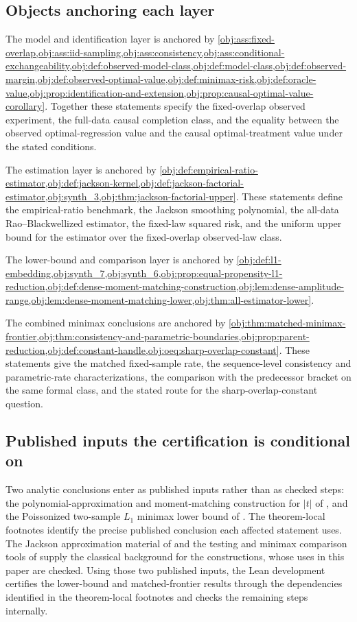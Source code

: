 \subsection*{Objects anchoring each layer}

The model and identification layer is anchored by \cref{obj:ass:fixed-overlap,obj:ass:iid-sampling,obj:ass:consistency,obj:ass:conditional-exchangeability,obj:def:observed-model-class,obj:def:model-class,obj:def:observed-margin,obj:def:observed-optimal-value,obj:def:minimax-risk,obj:def:oracle-value,obj:prop:identification-and-extension,obj:prop:causal-optimal-value-corollary}. Together these statements specify the fixed-overlap observed experiment, the full-data causal completion class, and the equality between the observed optimal-regression value and the causal optimal-treatment value under the stated conditions.

The estimation layer is anchored by \cref{obj:def:empirical-ratio-estimator,obj:def:jackson-kernel,obj:def:jackson-factorial-estimator,obj:synth_3,obj:thm:jackson-factorial-upper}. These statements define the empirical-ratio benchmark, the Jackson smoothing polynomial, the all-data Rao--Blackwellized estimator, the fixed-law squared risk, and the uniform upper bound for the estimator over the fixed-overlap observed-law class.

The lower-bound and comparison layer is anchored by \cref{obj:def:l1-embedding,obj:synth_7,obj:synth_6,obj:prop:equal-propensity-l1-reduction,obj:def:dense-moment-matching-construction,obj:lem:dense-amplitude-range,obj:lem:dense-moment-matching-lower,obj:thm:all-estimator-lower}.

The combined minimax conclusions are anchored by \cref{obj:thm:matched-minimax-frontier,obj:thm:consistency-and-parametric-boundaries,obj:prop:parent-reduction,obj:def:constant-handle,obj:oeq:sharp-overlap-constant}. These statements give the matched fixed-sample rate, the sequence-level consistency and parametric-rate characterizations, the comparison with the predecessor bracket on the same formal class, and the stated route for the sharp-overlap-constant question.

\subsection*{Published inputs the certification is conditional on}

Two analytic conclusions enter as published inputs rather than as checked steps: the polynomial-approximation and moment-matching construction for \(|t|\) of \citet[Lemma 1 and Section 3.1]{CaiLow2011L1}, and the Poissonized two-sample \(L_1\) minimax lower bound of \citet[Theorem 3, equation (24)]{JiaoHanWeissman2018L1}. The theorem-local footnotes identify the precise published conclusion each affected statement uses. The Jackson approximation material of \citet{DeVore1993} and the testing and minimax comparison tools of \citet{LeCam1986,Tsybakov2009} supply the classical background for the constructions, whose uses in this paper are checked. Using those two published inputs, the Lean development certifies the lower-bound and matched-frontier results through the dependencies identified in the theorem-local footnotes and checks the remaining steps internally.
